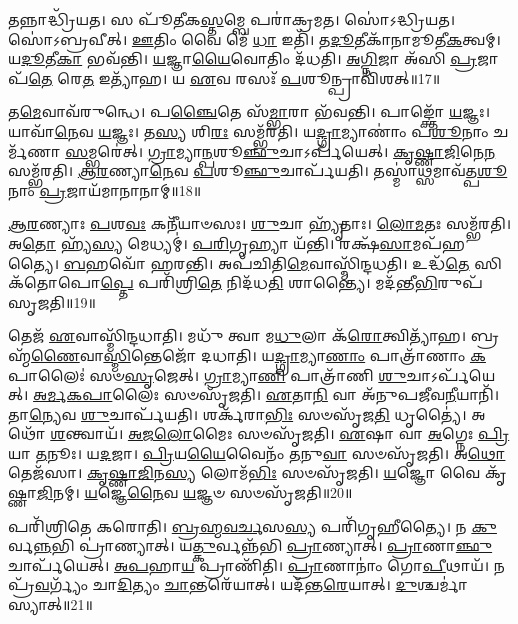 𑌤𑌨𑍍𑌨𑌾𑌦𑍍𑌧𑍍𑌰𑌿᳴𑌯𑌤। 
𑌸 𑌪𑍂᳴𑌤𑍀𑌕\-\ul{𑌸𑍍𑌤}\-𑌮𑍍𑌬𑍇 𑌪𑌰𑌾॑𑌕𑍍𑌰𑌮𑌤। 
𑌸𑍋॑𑌽𑌦𑍍𑌧𑍍𑌰𑌿𑌯𑌤। 
𑌸𑍋॑𑌽𑌬𑍍𑌰𑌵𑍀𑌤𑍍। 
\-\ul{𑌊}\-𑌤𑌿𑌂 𑌵𑍈 𑌮𑍇᳴ \ul{𑌧𑌾} 𑌇𑌤𑌿᳴। 
𑌤\-\ul{𑌦𑍂}\-𑌤𑍀𑌕𑌾᳴𑌨𑌾𑌮𑍂𑌤𑍀\-\ul{𑌕}\-𑌤𑍍𑌵𑌮𑍍। 
𑌯\-\ul{𑌦𑍂}\-𑌤𑍀\-\ul{𑌕𑌾} 𑌭𑌵᳴𑌨𑍍𑌤𑌿। 
\-\ul{𑌯}\-𑌜𑍍𑌞𑌾\-\ul{𑌯𑍈}\-𑌵𑍋𑌤𑌿𑌂 𑌦᳴𑌧𑌤𑌿। 
\-\ul{𑌅}\-\-\ul{𑌗𑍍𑌨𑌿}\-𑌜𑌾 𑌅᳴𑌸𑌿 \ul{𑌪𑍍𑌰}\-𑌜𑌾𑌪᳴\-\ul{𑌤𑍇} 𑌰𑍇\-\ul{𑌤} 𑌇𑌤𑍍𑌯𑌾᳴𑌹। 
𑌯 \ul{𑌏}\-𑌵 𑌰𑌸𑌃᳴ \ul{𑌪}\-𑌶𑍂𑌨𑍍𑌪𑍍𑌰𑌾𑌵𑌿᳴𑌶𑌤𑍍॥17॥

𑌤\-\ul{𑌮𑍇}\-𑌵𑌾𑌵᳴𑌰𑍁𑌨𑍍𑌧𑍇। 
𑌪\-\ul{𑌞𑍍𑌚𑍈}\-𑌤𑍇 𑌸᳴\-\ul{𑌮𑍍𑌭𑌾}\-𑌰𑌾 𑌭᳴𑌵𑌨𑍍𑌤𑌿। 
𑌪𑌾𑌙𑍍𑌕𑍍𑌤𑍋᳴ \ul{𑌯}\-𑌜𑍍𑌞𑌃। 
𑌯𑌾𑌵𑌾᳴\-\ul{𑌨𑍇}\-𑌵 \ul{𑌯}\-𑌜𑍍𑌞𑌃। 
𑌤\-\ul{𑌸𑍍𑌯} 𑌶𑌿\-\ul{𑌰𑌃} 𑌸𑌮𑍍𑌭᳴𑌰𑌤𑌿। 
𑌯\-\ul{𑌦𑍍𑌗𑍍𑌰𑌾}\-𑌮𑍍𑌯𑌾𑌣𑌾𑌂॑ 𑌪\-\ul{𑌶𑍂}\-𑌨𑌾𑌂 𑌚𑌰𑍍𑌮᳴𑌣𑌾 \ul{𑌸}\-𑌮𑍍𑌭𑌰𑍇॑𑌤𑍍। 
\-\ul{𑌗𑍍𑌰𑌾}\-𑌮𑍍𑌯𑌾\-\ul{𑌨𑍍𑌪}\-𑌶𑍂\-\ul{𑌞𑍍𑌛𑍁}\-𑌚𑌾𑌽𑌰𑍍𑌪᳴𑌯𑍇𑌤𑍍। 
\-\ul{𑌕𑍃}\-\-\ul{𑌷𑍍𑌣𑌾}\-\-\ul{𑌜𑌿}\-𑌨𑍇\-\ul{𑌨} 𑌸𑌮𑍍𑌭᳴𑌰𑌤𑌿। 
\-\ul{𑌆}\-\-\ul{𑌰}\-𑌣𑍍𑌯𑌾\-\ul{𑌨𑍇}\-𑌵 \ul{𑌪}\-𑌶𑍂\-\ul{𑌞𑍍𑌛𑍁}\-𑌚𑌾𑌰𑍍𑌪᳴𑌯𑌤𑌿। 
𑌤𑌸𑍍𑌮𑌾॑\-\ul{𑌥𑍍𑌸}\-𑌮𑌾𑌵᳴𑌤𑍍𑌪\-\ul{𑌶𑍂}\-𑌨𑌾𑌂 \ul{𑌪𑍍𑌰}\-𑌜𑌾𑌯᳴𑌮𑌾𑌨𑌾𑌨𑌾𑌮𑍍॥18॥

\-\ul{𑌆}\-\-\ul{𑌰}\-𑌣𑍍𑌯𑌾𑌃 \ul{𑌪}\-𑌶\-\ul{𑌵𑌃} 𑌕𑌨𑍀᳴𑌯𑌾𑍞𑌸𑌃। 
\-\ul{𑌶𑍁}\-𑌚𑌾 𑌹𑍍𑌯𑍃᳴𑌤𑌾𑌃। 
\-\ul{𑌲𑍋}\-\-\ul{𑌮}\-𑌤𑌃 𑌸𑌮𑍍𑌭᳴𑌰𑌤𑌿। 
𑌅\-\ul{𑌤𑍋} 𑌹𑍍𑌯᳴\-\ul{𑌸𑍍𑌯} 𑌮𑍇𑌧𑍍𑌯𑌮𑍍॑। 
\-\ul{𑌪}\-\-\ul{𑌰𑌿}\-𑌗𑍃𑌹𑍍𑌯𑌾 𑌯᳴𑌨𑍍𑌤𑌿। 
𑌰𑌕𑍍𑌷᳴\-\ul{𑌸𑌾}\-𑌮𑌪᳴𑌹𑌤𑍍𑌯𑍈। 
\-\ul{𑌬}\-𑌹𑌵𑍋᳴ 𑌹𑌰𑌨𑍍𑌤𑌿। 
𑌅𑌪᳴𑌚𑌿𑌤𑌿\-\ul{𑌮𑍇}\-𑌵𑌾𑌸𑍍𑌮𑌿᳴𑌨𑍍𑌦𑌧𑌤𑌿। 
𑌉𑌦𑍍𑌧᳴\-\ul{𑌤𑍇} 𑌸𑌿𑌕᳴𑌤𑍋𑌪𑍋\-\ul{𑌪𑍍𑌤𑍇} 𑌪𑌰𑌿᳴𑌶𑍍𑌰𑌿\-\ul{𑌤𑍇} 𑌨𑌿𑌦᳴𑌧\-\ul{𑌤𑌿} 𑌶𑌾𑌨𑍍𑌤𑍍𑌯𑍈॑। 
𑌮𑌦᳴𑌨𑍍𑌤𑍀\-\ul{𑌭𑌿}\-𑌰𑍁𑌪᳴ 𑌸𑍃𑌜𑌤𑌿॥19॥

𑌤𑍇𑌜᳴ \ul{𑌏}\-𑌵𑌾𑌸𑍍𑌮𑌿᳴𑌨𑍍𑌦𑌧𑌾𑌤𑌿। 
𑌮𑌧𑍁᳴ 𑌤𑍍𑌵𑌾 𑌮\-\ul{𑌧𑍁}\-𑌲𑌾 𑌕᳴\-\ul{𑌰𑍋}\-𑌤𑍍𑌵𑌿𑌤𑍍𑌯𑌾᳴𑌹। 
𑌬𑍍𑌰𑌹𑍍𑌮᳴\-\ul{𑌣𑍈}\-𑌵𑌾\-\ul{𑌸𑍍𑌮𑌿}\-𑌨𑍍𑌤𑍇𑌜𑍋᳴ 𑌦𑌧𑌾𑌤𑌿। 
𑌯\-\ul{𑌦𑍍𑌗𑍍𑌰𑌾}\-𑌮𑍍𑌯𑌾\-\ul{𑌣𑌾𑌂} 𑌪𑌾𑌤𑍍𑌰𑌾᳴𑌣𑌾𑌂 \ul{𑌕}\-𑌪𑌾𑌲𑍈𑌃॑ 𑌸𑍞\-\ul{𑌸𑍃}\-𑌜𑍇𑌤𑍍। 
\-\ul{𑌗𑍍𑌰𑌾}\-𑌮𑍍𑌯𑌾\-\ul{𑌣𑌿} 𑌪𑌾𑌤𑍍𑌰𑌾᳴𑌣𑌿 \ul{𑌶𑍁}\-𑌚𑌾𑌽𑌰𑍍𑌪᳴𑌯𑍇𑌤𑍍। 
\-\ul{𑌅}\-\-\ul{𑌰𑍍𑌮}\-\-\ul{𑌕}\-\-\ul{𑌪𑌾}\-𑌲𑍈𑌃 𑌸𑍞𑌸𑍃᳴𑌜𑌤𑌿। 
\-\ul{𑌏}\-𑌤𑌾\-\ul{𑌨𑌿} 𑌵𑌾 𑌅᳴𑌨𑍁𑌪𑌜𑍀𑌵\-\ul{𑌨𑍀}\-𑌯𑌾𑌨𑌿᳴। 
𑌤𑌾\-\ul{𑌨𑍍𑌯𑍇}\-𑌵 \ul{𑌶𑍁}\-𑌚𑌾𑌰𑍍𑌪᳴𑌯𑌤𑌿। 
𑌶𑌰𑍍𑌕᳴𑌰𑌾\-\ul{𑌭𑌿𑌃} 𑌸𑍞𑌸𑍃᳴𑌜\-\ul{𑌤𑌿} 𑌧𑍃𑌤𑍍𑌯𑍈॑। 
𑌅𑌥𑍋᳴ \ul{𑌶}\-𑌨𑍍𑌤𑍍𑌵𑌾𑌯᳴। 
\-\ul{𑌅}\-\-\ul{𑌜}\-\-\ul{𑌲𑍋}\-𑌮𑍈𑌃 𑌸𑍞𑌸𑍃᳴𑌜𑌤𑌿। 
\-\ul{𑌏}\-𑌷𑌾 𑌵𑌾 \ul{𑌅}\-𑌗𑍍𑌨𑍇𑌃 \ul{𑌪𑍍𑌰𑌿}\-𑌯𑌾 \ul{𑌤}\-𑌨𑍂𑌃। 
𑌯\-\ul{𑌦}\-𑌜𑌾। 
\-\ul{𑌪𑍍𑌰𑌿}\-𑌯\-\ul{𑌯𑍈}\-𑌵𑍈𑌨𑌂᳴ \ul{𑌤}\-𑌨𑍁\-\ul{𑌵𑌾} 𑌸𑍞𑌸𑍃᳴𑌜𑌤𑌿। 
𑌅\-\ul{𑌥𑍋} 𑌤𑍇𑌜᳴𑌸𑌾। 
\-\ul{𑌕𑍃}\-\-\ul{𑌷𑍍𑌣𑌾}\-\-\ul{𑌜𑌿}\-𑌨\-\ul{𑌸𑍍𑌯} 𑌲𑍋𑌮᳴\-\ul{𑌭𑌿𑌃} 𑌸𑍞𑌸𑍃᳴𑌜𑌤𑌿। 
\-\ul{𑌯}\-𑌜𑍍𑌞𑍋 𑌵𑍈 𑌕𑍃᳴𑌷𑍍𑌣𑌾\-\ul{𑌜𑌿}\-𑌨𑌮𑍍। 
\-\ul{𑌯}\-𑌜𑍍𑌞𑍇\-\ul{𑌨𑍈}\-𑌵 \ul{𑌯}\-𑌜𑍍𑌞𑍞 𑌸𑍞𑌸𑍃᳴𑌜𑌤𑌿॥20॥
\anuvakamend[\-\ul{𑌯𑌾}\-𑌜𑍍𑌯𑌾᳴\-\ul{𑌯𑍈} 𑌨 𑌜𑍁᳴\-\ul{𑌹𑍁}\-𑌯𑌾𑌦𑌵𑌿᳴\-\ul{𑌶}\-𑌦𑍍𑌵𑍇\-\ul{𑌣𑍁𑌃} 𑌶𑌾𑌨𑍍𑌤𑍍𑌯𑍈᳴ \ul{𑌪}\-𑌙𑍍𑌕𑍍𑌤𑌿𑌰𑌾᳴𑌧\-\ul{𑌸}\-𑌮𑌿𑌤𑍍𑌯𑌾᳴𑌹 𑌹𑌰𑌤𑌿 𑌦𑌿𑌹𑌨𑍍𑌤𑌿 \ul{𑌪}\-𑌰𑌾𑌕𑍍𑌰᳴\-\ul{𑌮}\-𑌤𑌾𑌵𑌿᳴𑌶𑌤𑍍 \ul{𑌪𑍍𑌰}\-𑌜𑌾𑌯᳴𑌮𑌾𑌨𑌾𑌨𑌾𑍞 𑌸𑍃𑌜𑌤𑌿 \ul{𑌶}\-𑌨𑍍𑌤𑍍𑌵𑌾\-\ul{𑌯𑌾}\-𑌷𑍍𑌟𑍗 𑌚᳴]

𑌪𑌰𑌿᳴𑌶𑍍𑌰𑌿𑌤𑍇 𑌕𑌰𑍋𑌤𑌿। 
\-\ul{𑌬𑍍𑌰}\-\-\ul{𑌹𑍍𑌮}\-\-\ul{𑌵}\-\-\ul{𑌰𑍍𑌚}\-𑌸\-\ul{𑌸𑍍𑌯} 𑌪𑌰𑌿᳴𑌗𑍃𑌹𑍀𑌤𑍍𑌯𑍈। 
𑌨 \ul{𑌕𑍁}\-𑌰𑍍𑌵\-\ul{𑌨𑍍𑌨}\-𑌭𑌿 𑌪𑍍𑌰𑌾॑𑌣𑍍𑌯𑌾𑌤𑍍। 
𑌯\-\ul{𑌤𑍍𑌕𑍁}\-𑌰𑍍𑌵𑌨𑍍𑌨᳴𑌭𑌿 \ul{𑌪𑍍𑌰𑌾}\-𑌣𑍍𑌯𑌾𑌤𑍍। 
\-\ul{𑌪𑍍𑌰𑌾}\-𑌣𑌾\-\ul{𑌞𑍍𑌛𑍁}\-𑌚𑌾𑌰𑍍𑌪᳴𑌯𑍇𑌤𑍍। 
\-\ul{𑌅}\-\-\ul{𑌪}\-𑌹𑌾\-\ul{𑌯} 𑌪𑍍𑌰𑌾𑌣𑌿᳴𑌤𑌿। 
\-\ul{𑌪𑍍𑌰𑌾}\-𑌣𑌾𑌨𑌾𑌂॑ 𑌗𑍋\-\ul{𑌪𑍀}\-𑌥𑌾𑌯᳴। 
𑌨 𑌪𑍍𑌰᳴\-\ul{𑌵}\-𑌰𑍍𑌗𑍍𑌯𑌂᳴ 𑌚𑌾\-\ul{𑌦𑌿}\-𑌤𑍍𑌯𑌂 \ul{𑌚𑌾}\-𑌨𑍍𑌤𑌰𑍇᳴𑌯𑌾𑌤𑍍। 
𑌯𑌦᳴𑌨𑍍𑌤\-\ul{𑌰𑍇}\-𑌯𑌾𑌤𑍍। 
\-\ul{𑌦𑍁}\-𑌶𑍍𑌚𑌰𑍍𑌮𑌾॑ 𑌸𑍍𑌯𑌾𑌤𑍍॥21॥

